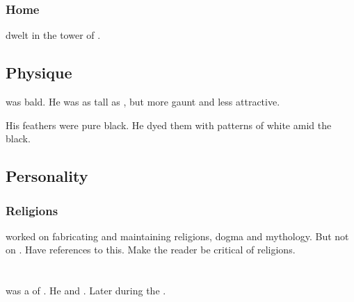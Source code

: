 \subsubsection{Home}
\Menessiaraid dwelt in the tower of . 









\subsection{Physique}
\Menessiaraid{} was bald. 
He was as tall as \Teshrial, but more gaunt and less attractive. 

His feathers were pure black.
He dyed them with patterns of white amid the black. 









\subsection{Personality}





\subsubsection{Religions}
\Menessiaraid worked on fabricating and maintaining religions, dogma and mythology. 
But not on \Azmith. 
Have references to this. 
Make the reader be critical of religions. 















\section{\Morcariel}
\index{\Morcariel}
\Morcariel was a \sathariah \resphan of \CiriathSepher. 
He  and . 
Later  during the .

